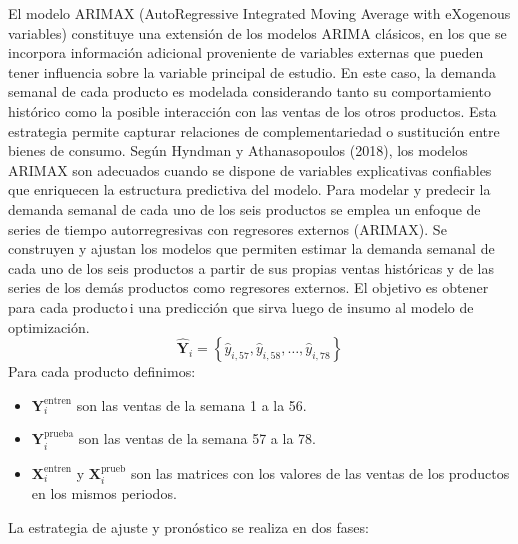 \documentclass[12pt]{article}
\begin{document}
El modelo ARIMAX (AutoRegressive Integrated Moving Average with eXogenous variables) constituye una extensión de los modelos ARIMA clásicos, en los que se incorpora información adicional proveniente de variables externas que pueden tener influencia sobre la variable principal de estudio. En este caso, la demanda semanal de cada producto es modelada considerando tanto su comportamiento histórico como la posible interacción con las ventas de los otros productos. Esta estrategia permite capturar relaciones de complementariedad o sustitución entre bienes de consumo. Según Hyndman y Athanasopoulos (2018), los modelos ARIMAX son adecuados cuando se dispone de variables explicativas confiables que enriquecen la estructura predictiva del modelo.
\vspace{0.3cm}
Para modelar y predecir la demanda semanal de cada uno de los seis productos se emplea un enfoque de series de tiempo autorregresivas con regresores externos (ARIMAX). Se construyen y ajustan los modelos que permiten estimar la demanda semanal de cada uno de los seis productos a partir de sus propias ventas históricas y de las series de los demás productos como regresores externos. El objetivo es obtener para cada producto i una predicción que sirva luego de insumo al modelo de optimización. 
\vspace{0.3cm}
\begin{equation}
\hat{\mathbf{Y}}_i = \left\{ \hat{y}_{i,57}, \hat{y}_{i,58}, \ldots, \hat{y}_{i,78} \right\}
\end{equation}
Para cada producto definimos:
\begin{itemize}
    \item $\mathbf{Y}_i^{\text{entren}}$ son las ventas de la semana 1 a la 56.
\end{itemize}
\begin{itemize}
    \item $\mathbf{Y}_i^{\text{prueba}}$ son las ventas de la semana 57 a la 78.
\end{itemize}
\begin{itemize}
    \item $\mathbf{X}_i^{\text{entren}}$  y $\mathbf{X}_i^{\text{prueb}}$ son las matrices con los valores de las ventas de los productos en los mismos periodos.
\end{itemize}
\vspace{0.3cm}
La estrategia de ajuste y pronóstico se realiza en dos fases:
\end{document}
